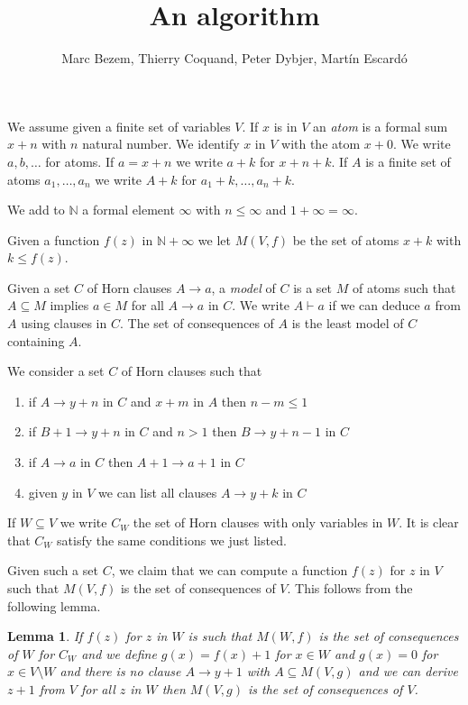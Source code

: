 \documentclass[11pt,a4paper]{article}
\newtheorem{lemma}{Lemma}[theorem]
\newcommand{\nats}{\mathbb{N}}
\begin{document}
\title{An algorithm}

\author{Marc Bezem, Thierry Coquand, Peter Dybjer, Mart\'in Escard\'o}
\date{}
\maketitle



We assume given a finite set of variables $V$. If $x$ is in $V$
an {\em atom} is a formal sum $x+n$ with $n$ natural number. We identify
$x$ in $V$ with the atom $x+0$. We write $a,b,\dots$ for atoms.
If $a = x+n$ we write $a+k$ for $x+n+k$. If $A$ is a finite set of atoms $a_1,\dots,a_n$
we write $A+k$ for $a_1+k,\dots, a_n+k$.

 We add to $\nats$ a formal element $\infty$ with $n\leqslant \infty$ and $1+\infty = \infty$.

 Given a function $f(z)$ in $\nats + \infty$ we let $M(V,f)$ be the set of atoms
 $x+k$ with $k\leqslant f(z)$.

 Given a set $C$ of Horn clauses $A\rightarrow a$, a {\em model} of $C$ is
a set $M$ of atoms such that $A\subseteq M$ implies $a\in M$ for all $A\rightarrow a$
in $C$. We write $A\vdash a$ if we can deduce $a$ from $A$ using clauses in $C$.
The set of consequences of $A$ is the least model of $C$ containing $A$.

 We consider a set $C$ of Horn clauses such that
\begin{enumerate}
\item if $A\rightarrow y+n$ in $C$ and $x+m$ in $A$ then $n-m\leqslant 1$
\item if $B+1\rightarrow y+n$ in $C$ and $n>1$ then $B\rightarrow y+n-1$ in $C$
\item if $A\rightarrow a$ in $C$ then $A+1\rightarrow a+1$ in $C$
\item given $y$ in $V$ we can list all clauses $A\rightarrow y+k$ in $C$  
\end{enumerate}  

If $W\subseteq V$ we write $C_W$ the set of Horn clauses with only variables in $W$.
It is clear that $C_W$ satisfy the same conditions we just listed.

Given such a set $C$, we claim that we can compute a function $f(z)$ for $z$ in $V$
such that $M(V,f)$ is the set of consequences of $V$. This follows from the following lemma.


\begin{lemma}
  If $f(z)$ for $z$ in $W$ is such that $M(W,f)$ is the set of consequences of $W$ for $C_W$
  and we define $g(x) = f(x)+1$ for $x\in W$ and $g(x) = 0$ for $x\in V\setminus W$
  and there is no clause $A\rightarrow y+1$ with $A\subseteq M(V,g)$
  and we can derive $z+1$ from $V$ for all $z$ in $W$
  then $M(V,g)$ is the set of consequences of $V$. 
\end{lemma}  
 
\end{document}
